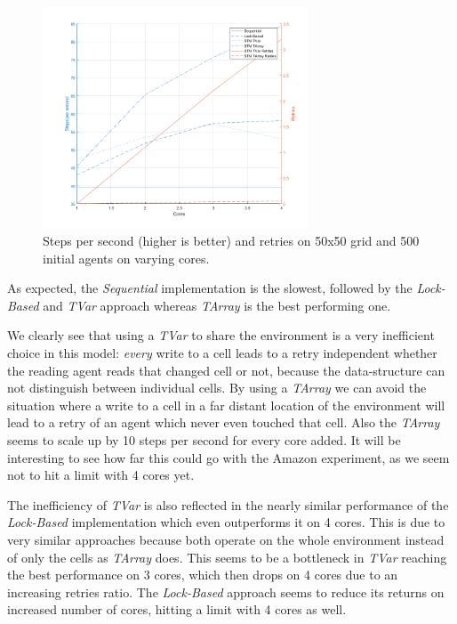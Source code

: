 \begin{figure}
	\centering
	\includegraphics[width=0.7\textwidth, angle=0]{./fig/concurrentabs/sugarscape/varying_cores.png}
	\caption{Steps per second (higher is better) and retries on 50x50 grid and 500 initial agents on varying cores.}
	\label{fig:varying_cores}
\end{figure}

As expected, the \textit{Sequential} implementation is the slowest, followed by the \textit{Lock-Based} and \textit{TVar} approach whereas \textit{TArray} is the best performing one.

We clearly see that using a \textit{TVar} to share the environment is a very inefficient choice in this model: \textit{every} write to a cell leads to a retry independent whether the reading agent reads that changed cell or not, because the data-structure can not distinguish between individual cells. By using a \textit{TArray} we can avoid the situation where a write to a cell in a far distant location of the environment will lead to a retry of an agent which never even touched that cell. Also the \textit{TArray} seems to scale up by 10 steps per second for every core added. It will be interesting to see how far this could go with the Amazon experiment, as we seem not to hit a limit with 4 cores yet.

The inefficiency of \textit{TVar} is also reflected in the nearly similar performance of the \textit{Lock-Based} implementation which even outperforms it on 4 cores. This is due to very similar approaches because both operate on the whole environment instead of only the cells as \textit{TArray} does. This seems to be a bottleneck in \textit{TVar} reaching the best performance on 3 cores, which then drops on 4 cores due to an increasing retries ratio. The \textit{Lock-Based} approach seems to reduce its returns on increased number of cores, hitting a limit with 4 cores as well.

